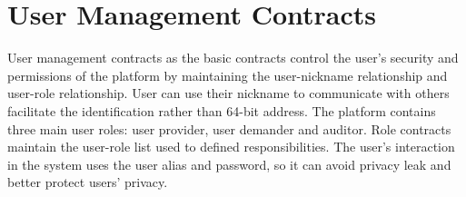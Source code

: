 \section{User Management Contracts}
User management contracts as the basic contracts control
the user’s security and permissions of the platform by
maintaining the user-nickname relationship and user-role
relationship. User can use their nickname to communicate
with others facilitate the identification rather than 64-bit
address. The platform contains three main user roles: user
provider, user demander and auditor. Role contracts maintain
the user-role list used to defined responsibilities. The user's
interaction in the system uses the user alias and password, so
it can avoid privacy leak and better protect users' privacy.
